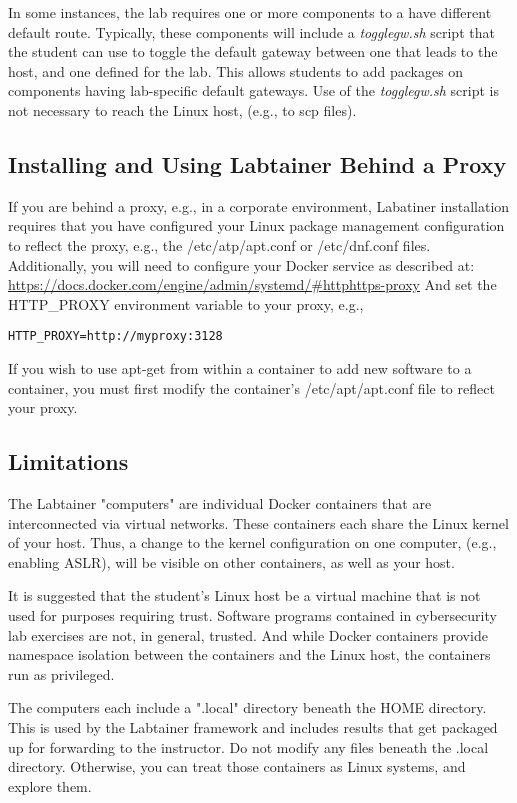\documentclass[12pt]{article}
\begin{document}
In some instances, the lab requires one or more components to a have different default route.
Typically, these components will include a \textit{togglegw.sh} script that the student
can use to toggle the default gateway between one that leads to the host, and one defined for the lab.
This allows students to add packages on components having lab-specific default gateways.
Use of the \textit{togglegw.sh} script is not necessary to reach the Linux host, (e.g., to scp files).

\subsection{Installing and Using Labtainer Behind a Proxy}
If you are behind a proxy, e.g., in a corporate environment, Labatiner installation
requires that you have configured your Linux package management configuration to reflect
the proxy, e.g., the /etc/atp/apt.conf or /etc/dnf.conf files.  Additionally,
you will need to configure your Docker service as described at:
\url{https://docs.docker.com/engine/admin/systemd/#httphttps-proxy}
And set the HTTP\_PROXY environment variable to your proxy, e.g., 
\begin{verbatim}
HTTP_PROXY=http://myproxy:3128
\end{verbatim}
If you wish to use apt-get from within a container to add new software to a container, you
must first modify the container's /etc/apt/apt.conf file to reflect your proxy.

\subsection{Limitations}
The Labtainer "computers" are individual Docker containers that are interconnected via virtual
networks.  These containers each share the Linux kernel of your host.  Thus, a change
to the kernel configuration on one computer, (e.g., enabling ASLR), will be visible on
other containers, as well as your host.

It is suggested that the student's Linux host be a virtual machine that is
not used for purposes requiring trust.  Software programs contained in cybersecurity lab
exercises are not, in general, trusted.  And while Docker containers provide namespace
isolation between the containers and the Linux host, the containers run as privileged.

The computers each include a ".local" directory beneath the HOME directory.  This is used
by the Labtainer framework and includes results that get packaged up for forwarding to the
instructor.  Do not modify any files beneath the .local directory.  Otherwise, you can treat
those containers as Linux systems, and explore them.
\end{document}
